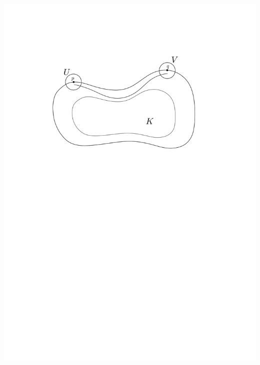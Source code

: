 \begin{frame}[t]
{    \includegraphics[width=1.05\textwidth, trim=0 18cm 0 3cm]{nonvis4.png}
  }
\end{frame}
